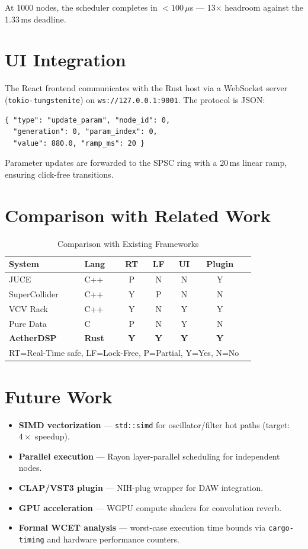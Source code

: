 \documentclass[conference]{IEEEtran}
\begin{document}
At 1000 nodes, the scheduler completes in $< 100\,\mu$s — 13$\times$ headroom
against the 1.33\,ms deadline.

\section{UI Integration}

The React frontend communicates with the Rust host via a WebSocket server
(\texttt{tokio-tungstenite}) on \texttt{ws://127.0.0.1:9001}. The protocol is
JSON:

\begin{lstlisting}
{ "type": "update_param", "node_id": 0,
  "generation": 0, "param_index": 0,
  "value": 880.0, "ramp_ms": 20 }
\end{lstlisting}

Parameter updates are forwarded to the SPSC ring with a 20\,ms linear ramp,
ensuring click-free transitions.

\section{Comparison with Related Work}

\begin{table}[h]
\caption{Comparison with Existing Frameworks}
\centering
\begin{tabular}{llccccc}
\hline
\textbf{System} & \textbf{Lang} & \textbf{RT} & \textbf{LF} & \textbf{UI} & \textbf{Plugin} \\
\hline
JUCE & C++ & P & N & N & Y \\
SuperCollider & C++ & Y & P & N & N \\
VCV Rack & C++ & Y & N & Y & Y \\
Pure Data & C & P & N & Y & N \\
\textbf{AetherDSP} & \textbf{Rust} & \textbf{Y} & \textbf{Y} & \textbf{Y} & \textbf{Y} \\
\hline
\multicolumn{6}{l}{\footnotesize RT=Real-Time safe, LF=Lock-Free, P=Partial, Y=Yes, N=No}
\end{tabular}
\end{table}

\section{Future Work}

\begin{itemize}
  \item \textbf{SIMD vectorization} — \texttt{std::simd} for oscillator/filter
    hot paths (target: $4\times$ speedup).
  \item \textbf{Parallel execution} — Rayon layer-parallel scheduling for
    independent nodes.
  \item \textbf{CLAP/VST3 plugin} — NIH-plug wrapper for DAW integration.
  \item \textbf{GPU acceleration} — WGPU compute shaders for convolution reverb.
  \item \textbf{Formal WCET analysis} — worst-case execution time bounds via
    \texttt{cargo-timing} and hardware performance counters.
\end{itemize}
\end{document}
